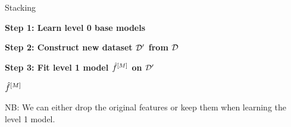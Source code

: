 \documentclass[11pt,compress,t,notes=noshow, aspectratio=169, xcolor=table]{beamer}
\begin{document}

\begin{vbframe}{Stacking}
\footnotesize
\begin{algorithm}[H]
    \SetAlgoLined
    \caption{Single Layer Stacking}

    
    \BlankLine
    \textbf{Step 1: Learn level 0 base models}\;\\
    
    \BlankLine
    \textbf{Step 2: Construct new dataset $\mathcal{D}^\prime$ from $\mathcal{D}$}\;\\
    
    \BlankLine
    \textbf{Step 3: Fit level 1 model $\hat{f}^{[M]}$ on $\mathcal{D}^\prime$}\;
    
    \KwRet $\hat{f}^{[M]}$\;
\end{algorithm}
NB: We can either drop the original features or keep them when learning the level 1 model.

\end{vbframe}

\end{document}
